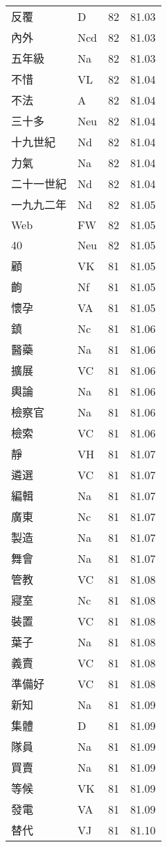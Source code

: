 \documentclass[twocolumn]{book}
\begin{document}
\begin{supertabular}{llrr}
反覆 & D & 82 &  81.03\\
內外 & Ncd & 82 &  81.03\\
五年級 & Na & 82 &  81.03\\
不惜 & VL & 82 &  81.04\\
不法 & A & 82 &  81.04\\
三十多 & Neu & 82 &  81.04\\
十九世紀 & Nd & 82 &  81.04\\
力氣 & Na & 82 &  81.04\\
二十一世紀 & Nd & 82 &  81.04\\
一九九二年 & Nd & 82 &  81.05\\
Web & FW & 82 &  81.05\\
40 & Neu & 82 &  81.05\\
顧 & VK & 81 &  81.05\\
齣 & Nf & 81 &  81.05\\
懷孕 & VA & 81 &  81.05\\
鎮 & Nc & 81 &  81.06\\
醫藥 & Na & 81 &  81.06\\
擴展 & VC & 81 &  81.06\\
輿論 & Na & 81 &  81.06\\
檢察官 & Na & 81 &  81.06\\
檢索 & VC & 81 &  81.06\\
靜 & VH & 81 &  81.07\\
遴選 & VC & 81 &  81.07\\
編輯 & Na & 81 &  81.07\\
廣東 & Nc & 81 &  81.07\\
製造 & Na & 81 &  81.07\\
舞會 & Na & 81 &  81.07\\
管教 & VC & 81 &  81.08\\
寢室 & Nc & 81 &  81.08\\
裝置 & VC & 81 &  81.08\\
葉子 & Na & 81 &  81.08\\
義賣 & VC & 81 &  81.08\\
準備好 & VC & 81 &  81.08\\
新知 & Na & 81 &  81.09\\
集體 & D & 81 &  81.09\\
隊員 & Na & 81 &  81.09\\
買賣 & Na & 81 &  81.09\\
等候 & VK & 81 &  81.09\\
發電 & VA & 81 &  81.09\\
替代 & VJ & 81 &  81.10\\

\end{supertabular}
\end{document}
